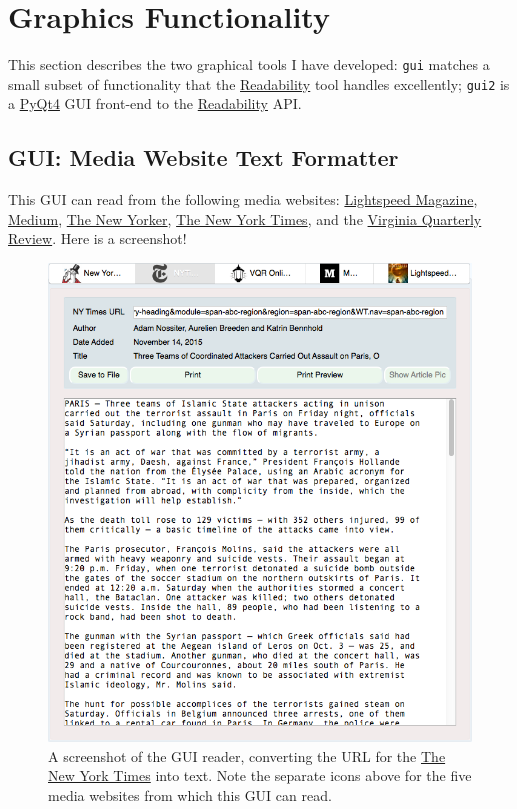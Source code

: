 \documentclass[]{article}
\begin{document}
\section{Graphics Functionality}\label{sec:graphics_functionality}
This section describes the two graphical tools I have developed:
{\verb|gui|} matches a small subset of functionality that the
\href{https://www.readability.com}{Readability} tool handles
excellently; {\verb|gui2|} is a
\href{https://www.riverbankcomputing.com/software/pyqt/download}{PyQt4}
GUI front-end to the \href{https://www.readability.com}{Readability}
API.

\subsection{GUI: Media Website Text Formatter} \label{subsec:gui}
This GUI can read from the following media websites:
\href{http://www.lightspeedmagazine.com/}{Lightspeed Magazine},
\href{https://medium.com/}{Medium},
\href{http://www.newyorker.com/}{The New Yorker},
\href{http://www.nytimes.com/?WT.z_jog=1}{The New York Times}, and the
\href{http://www.vqronline.org/}{Virginia Quarterly Review}. Here is a
screenshot!
\begin{figure}[!ht]
  \parbox[!ht]{0.65\linewidth}{%
    \includegraphics[width=\linewidth]{images/gui_screenshot.png}
  } \hfill
  \parbox[!ht]{0.34\linewidth}{%
    \caption{A screenshot of the GUI reader, converting the URL for
      the \href{http://www.nytimes.com}{The New York Times} into
      text. Note the separate icons above for the five media websites
      from which this GUI can read.} \label{fig:gui_screenshot}}
\end{figure}
\end{document}
